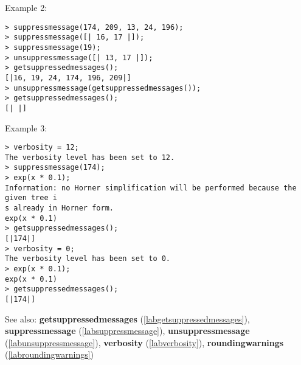 \noindent Example 2: 
\begin{center}\begin{minipage}{15cm}\begin{Verbatim}[frame=single,commandchars=\\\|\~]
> suppressmessage(174, 209, 13, 24, 196);
> suppressmessage([| 16, 17 |]);
> suppressmessage(19);
> unsuppressmessage([| 13, 17 |]);
> getsuppressedmessages();
[|16, 19, 24, 174, 196, 209|]
> unsuppressmessage(getsuppressedmessages());
> getsuppressedmessages();
[| |]
\end{Verbatim}
\end{minipage}\end{center}
\noindent Example 3: 
\begin{center}\begin{minipage}{15cm}\begin{Verbatim}[frame=single,commandchars=\\\|\~]
> verbosity = 12;
The verbosity level has been set to 12.
> suppressmessage(174);
> exp(x * 0.1);
Information: no Horner simplification will be performed because the given tree i
s already in Horner form.
exp(x * 0.1)
> getsuppressedmessages();
[|174|]
> verbosity = 0;
The verbosity level has been set to 0.
> exp(x * 0.1);
exp(x * 0.1)
> getsuppressedmessages();
[|174|]
\end{Verbatim}
\end{minipage}\end{center}
See also: \textbf{getsuppressedmessages} (\ref{labgetsuppressedmessages}), \textbf{suppressmessage} (\ref{labsuppressmessage}), \textbf{unsuppressmessage} (\ref{labunsuppressmessage}), \textbf{verbosity} (\ref{labverbosity}), \textbf{roundingwarnings} (\ref{labroundingwarnings})
